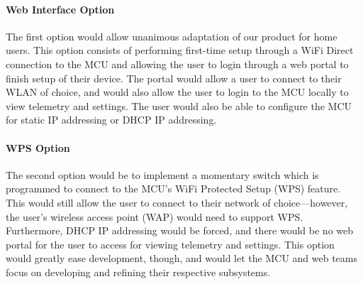 \paragraph{Web Interface Option}
The first option would allow unanimous adaptation of
our product for home users. This option consists of performing first-time
setup through a WiFi Direct connection to the MCU and allowing the user
to login through a web portal to finish setup of their device. The portal
would allow a user to connect to their WLAN of choice, and would
also allow the user to login to the MCU locally to view telemetry and 
settings. The user would also be able to configure the MCU for static
IP addressing or DHCP IP addressing.

\paragraph{WPS Option}
The second option would be to implement a momentary switch which is
programmed to connect to the MCU's WiFi Protected Setup (WPS) feature.
This would still allow the user to connect to their network of
choice---however, the user's wireless access point (WAP) would need to
support WPS. Furthermore, DHCP IP addressing would be forced, and there
would be no web portal for the user to access for viewing telemetry and
settings. This option would greatly ease development, though, and would
let the MCU and web teams focus on developing and refining their
respective subsystems.

